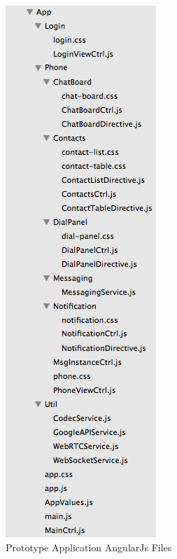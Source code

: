\begin{appendices}
\begin{figure}
	\centering
    	\includegraphics[height=0.45\textheight,natwidth=610,natheight=642]{figs/angularjs_structure.png}
  	\caption{Prototype Application AngularJs Files}
  	\label{fig:angularjs_structure}
\end{figure}

\end{appendices}